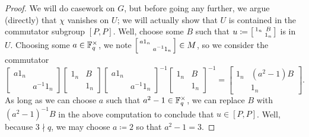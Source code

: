 \begin{proof}
    We will do casework on $G$, but before going any further, we argue (directly) that $\chi$ vanishes on $U$; we will actually show that $U$ is contained in the commutator subgroup $[P,P]$. Well, choose some $B$ such that $u\coloneqq\begin{bsmallmatrix}
        1_n & B \\
        & 1_n
    \end{bsmallmatrix}$ is in $U$. Choosing some $a\in\mathbb F_q^\times$, we note $\begin{bsmallmatrix}
        a1_n \\ & a^{-1}1_n
    \end{bsmallmatrix}\in M$, so we consider the commutator
    \[\begin{bmatrix}
        a1_n \\ & a^{-1}1_n
    \end{bmatrix}\begin{bmatrix}
        1_n & B \\ & 1_n
    \end{bmatrix}\begin{bmatrix}
        a1_n \\ & a^{-1}1_n
    \end{bmatrix}^{-1}\begin{bmatrix}
        1_n & B \\ & 1_n
    \end{bmatrix}^{-1}=\begin{bmatrix}
        1_n & \left(a^2-1\right)B \\ & 1_n
    \end{bmatrix}.\]
    As long as we can choose $a$ such that $a^2-1\in\mathbb F_q^\times$, we can replace $B$ with $\left(a^2-1\right)^{-1}B$ in the above computation to conclude that $u\in[P,P]$. Well, because $3\nmid q$, we may choose $a\coloneqq2$ so that $a^2-1=3$.


\end{proof}
